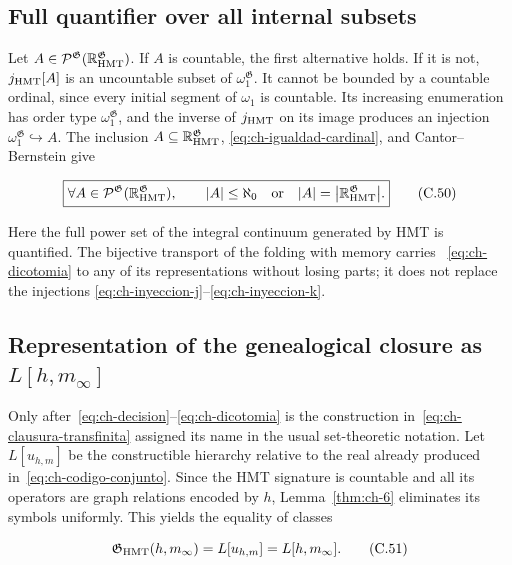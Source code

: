 \subsection{Full quantifier over all internal subsets}

Let \(A\in\mathcal P^{\mathfrak G}
(\mathbb R_{\rm HMT}^{\mathfrak G})\). If \(A\) is countable, the first
alternative holds. If it is not, \(j_{\rm HMT}[A]\) is an uncountable subset
of \(\omega_1^{\mathfrak G}\). It cannot be bounded by a countable ordinal,
since every initial segment of \(\omega_1\) is countable. Its increasing
enumeration has order type \(\omega_1^{\mathfrak G}\), and the inverse of
\(j_{\rm HMT}\) on its image produces an injection
\(\omega_1^{\mathfrak G}\hookrightarrow A\). The inclusion
\(A\subseteq\mathbb R_{\rm HMT}^{\mathfrak G}\),
\eqref{eq:ch-igualdad-cardinal}, and Cantor--Bernstein give

\[
 \boxed{
 \forall A\in\mathcal P^{\mathfrak G}
   (\mathbb R_{\rm HMT}^{\mathfrak G}),\qquad
 |A|\le\aleph_0
 \quad\text{or}\quad
 |A|=\bigl|\mathbb R_{\rm HMT}^{\mathfrak G}\bigr|.}
\tag{C.50}\label{eq:ch-dicotomia}
\]

Here the full power set of the integral continuum generated by HMT is
quantified. The bijective transport of the folding with memory carries
~\eqref{eq:ch-dicotomia} to any of its representations without losing parts;
it does not replace the injections
\eqref{eq:ch-inyeccion-j}--\eqref{eq:ch-inyeccion-k}.

\subsection{Representation of the genealogical closure as \texorpdfstring{\(L[h,m_\infty]\)}{L[h,m-infinity]}}

Only after~\eqref{eq:ch-decision}--\eqref{eq:ch-dicotomia} is the construction
in~\eqref{eq:ch-clausura-transfinita} assigned its name in the usual
set-theoretic notation. Let \(L[u_{h,m}]\) be the constructible hierarchy
relative to the real already produced in~\eqref{eq:ch-codigo-conjunto}. Since
the HMT signature is countable and all its operators are graph relations
encoded by \(h\), Lemma~\ref{thm:ch-6} eliminates its symbols uniformly. This
yields the equality of classes

\[
 \mathfrak G_{\rm HMT}(h,m_\infty)
 =L[u_{h,m}]=L[h,m_\infty].
\tag{C.51}\label{eq:ch-representacion-L}
\]

